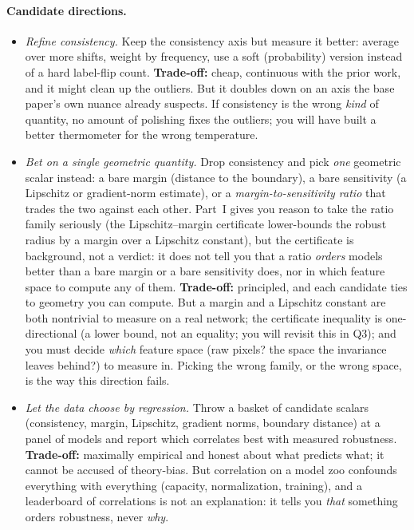 \paragraph{Candidate directions.}
\begin{itemize}[leftmargin=1.4em]
  \item \emph{Refine consistency.} Keep the consistency axis but measure it better: average over
        more shifts, weight by frequency, use a soft (probability) version instead of a hard
        label-flip count. \textbf{Trade-off:} cheap, continuous with the prior work, and it might
        clean up the outliers. But it doubles down on an axis the base paper's own nuance already
        suspects. If consistency is the wrong \emph{kind} of quantity, no amount of polishing fixes
        the outliers; you will have built a better thermometer for the wrong temperature.
  \item \emph{Bet on a single geometric quantity.} Drop consistency and pick \emph{one} geometric
        scalar instead: a bare margin (distance to the boundary), a bare sensitivity (a Lipschitz or
        gradient-norm estimate), or a \emph{margin-to-sensitivity ratio} that trades the two against
        each other. Part~I gives you reason to take the ratio family seriously (the
        Lipschitz--margin certificate lower-bounds the robust radius by a margin over a Lipschitz
        constant), but the certificate is background, not a verdict: it does not tell you that a
        ratio \emph{orders} models better than a bare margin or a bare sensitivity does, nor in which
        feature space to compute any of them. \textbf{Trade-off:} principled, and each candidate
        ties to geometry you can compute. But a margin and a Lipschitz constant are both nontrivial
        to measure on a real network; the certificate inequality is one-directional (a lower bound,
        not an equality; you will revisit this in Q3); and you must decide \emph{which} feature
        space (raw pixels? the space the invariance leaves behind?) to measure in. Picking the wrong
        family, or the wrong space, is the way this direction fails.
  \item \emph{Let the data choose by regression.} Throw a basket of candidate scalars (consistency,
        margin, Lipschitz, gradient norms, boundary distance) at a panel of models and report which
        correlates best with measured robustness. \textbf{Trade-off:} maximally empirical and
        honest about what predicts what; it cannot be accused of theory-bias. But correlation on a
        model zoo confounds everything with everything (capacity, normalization, training), and a
        leaderboard of correlations is not an explanation: it tells you \emph{that} something
        orders robustness, never \emph{why}.
\end{itemize}

